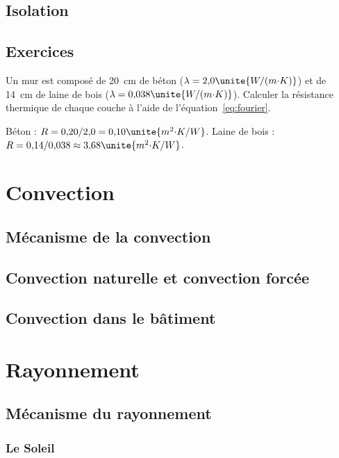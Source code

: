 \section{Isolation}

\section{Exercices}

\begin{exercice}
Un mur est composé de 20~cm de béton ($\lambda = 2{,}0\unite{W/(m{\cdot}K)}$) et de 14~cm de laine de bois ($\lambda = 0{,}038\unite{W/(m{\cdot}K)}$). Calculer la résistance thermique de chaque couche à l'aide de l'équation~\eqref{eq:fourier}.
\end{exercice}

\begin{corrige}
Béton : $R = 0{,}20 / 2{,}0 = 0{,}10\unite{m^2{\cdot}K/W}$. Laine de bois : $R = 0{,}14 / 0{,}038 \approx 3{,}68\unite{m^2{\cdot}K/W}$.
\end{corrige}

\chapter{Convection}
\label{chap:convection}

\section{Mécanisme de la convection}

\section{Convection naturelle et convection forcée}

\section{Convection dans le bâtiment}

\chapter{Rayonnement}
\label{chap:rayonnement}

\section{Mécanisme du rayonnement}

\subsection{Le Soleil}

